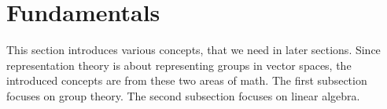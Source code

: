 \section{Fundamentals}


This section introduces various concepts, that we need in later sections.
Since representation theory is about representing groups in vector spaces, the introduced concepts are from these two areas of math.
The first subsection focuses on group theory.
The second subsection focuses on linear algebra.



